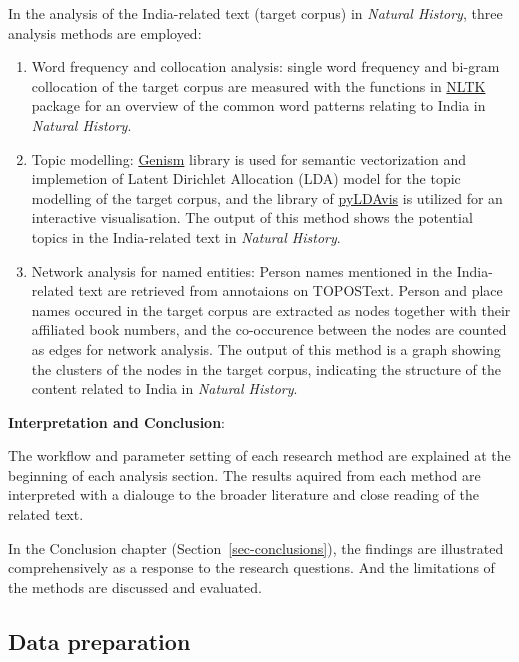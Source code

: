 \documentclass[
  12pt,
]{article}
\begin{document}
In the analysis of the India-related text (target corpus) in
\emph{Natural History}, three analysis methods are employed:

\begin{enumerate}
\def\labelenumi{\arabic{enumi}.}
\item
  Word frequency and collocation analysis: single word frequency and
  bi-gram collocation of the target corpus are measured with the
  functions in \href{https://www.nltk.org/}{NLTK} package for an
  overview of the common word patterns relating to India in
  \emph{Natural History}.
\item
  Topic modelling: \href{https://radimrehurek.com/gensim/}{Genism}
  library is used for semantic vectorization and implemetion of Latent
  Dirichlet Allocation (LDA) model for the topic modelling of the target
  corpus, and the library of
  \href{https://pyldavis.readthedocs.io/en/latest/index.htmlgenism}{pyLDAvis}
  is utilized for an interactive visualisation. The output of this
  method shows the potential topics in the India-related text in
  \emph{Natural History}.
\item
  Network analysis for named entities: Person names mentioned in the
  India-related text are retrieved from annotaions on TOPOSText. Person
  and place names occured in the target corpus are extracted as nodes
  together with their affiliated book numbers, and the co-occurence
  between the nodes are counted as edges for network analysis. The
  output of this method is a graph showing the clusters of the nodes in
  the target corpus, indicating the structure of the content related to
  India in \emph{Natural History}.
\end{enumerate}

\textbf{Interpretation and Conclusion}:

The workflow and parameter setting of each research method are explained
at the beginning of each analysis section. The results aquired from each
method are interpreted with a dialouge to the broader literature and
close reading of the related text.

In the Conclusion chapter (Section~\ref{sec-conclusions}), the findings
are illustrated comprehensively as a response to the research questions.
And the limitations of the methods are discussed and evaluated.

\hypertarget{data-preparation}{%
\subsection{Data preparation}\label{data-preparation}}
\end{document}
